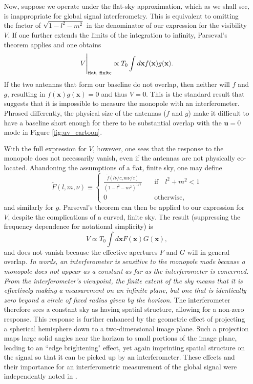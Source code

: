 \documentclass[twocolumn,apj,numberedappendix]{emulateapj}
\begin{document}
Now, suppose we operate under the flat-sky approximation, which as we shall see, is inappropriate for global signal interferometry. This is equivalent to omitting the
factor of $\sqrt{1-l^2 - m^2}$ in the denominator of our expression for the visibility $V$.
If one further extends the limits of the integration to infinity, Parseval's theorem applies and
one obtains
\begin{equation}
\label{eq:fdotg}
V\Bigg{|}_\textrm{flat, finite} \propto T_0 \int d\mathbf{x} f (\mathbf{x}) g(\mathbf{x}).
\end{equation}
If the two antennas that form our baseline do not overlap, then neither will $f$ and $g$, resulting
in $f (\mathbf{x}) g(\mathbf{x}) = 0$ and thus $V=0$. This is the standard result that suggests
that it is impossible to measure the monopole with an interferometer. Phrased differently, the
physical size of the antennas ($f$ and $g$) make it difficult to have a baseline short enough
for there to be substantial overlap with the $\mathbf{u} = 0$ mode in Figure \ref{fig:uv_cartoon}.

With the full expression for $V$, however, one sees that the response to the monopole does
not necessarily vanish, even if the antennas are not physically co-located. Abandoning the
assumptions of a flat, finite sky, one may define
\begin{equation}
\label{eq:FspaceEffectiveAperture}
\widetilde{F} (l, m, \nu) \equiv
\begin{cases}
\frac{\tilde{f} (l\nu / c,m\nu / c)}{(1-l^2 - m^2)^{1/4}} \quad & \textrm{if} \quad l^2 + m^2 < 1 \\
0 \quad &\textrm{otherwise},
\end{cases}
\end{equation}
and similarly for $g$. Parseval's theorem can then be applied to our expression for $V$, despite
the complications of a curved, finite sky. The result (suppressing the frequency dependence for
notational simplicity) is
\begin{equation}
\label{eq:effFdotG}
V \propto T_0 \int d\mathbf{x} F(\mathbf{x}) G(\mathbf{x}),
\end{equation}
and does not vanish because the effective apertures $F$ and $G$ will in general overlap. \emph{In words,
an interferometer is sensitive to the monopole mode because a monopole does not appear as a
constant as far as the interferometer is concerned. From the interferometer's viewpoint, the finite
extent of the sky means that it is effectively making a measurement on an infinite plane, but one that is identically zero beyond a circle of fixed radius given by the horizon.} The interferometer therefore
sees a constant sky as having spatial structure, allowing for a non-zero response. This response
is further enhanced by the geometric effect of projecting a spherical hemisphere down to a two-dimensional
image plane. Such a projection maps large solid angles near the horizon to small portions of the image
plane, leading to an ``edge brightening" effect, yet again imprinting spatial structure on the signal so that it can be picked up by an interferometer. These
effects and their importance for an interferometric measurement of the global signal were independently
noted in \citet{Thyagarajan_et_al2015}. 
\end{document}
